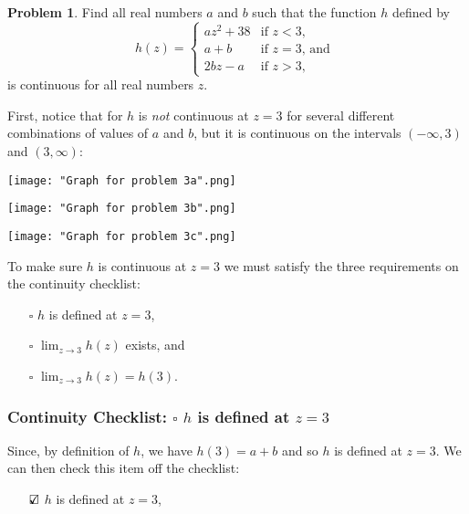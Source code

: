 \documentclass{article}
\theoremstyle{definition}
\newtheorem{Problem}{Problem}
\begin{document}
\begin{Problem}
  Find all real numbers $a$ and $b$ such that the function $h$ defined by
  \[
    h(z) =
    \begin{cases}
      az^2 + 38 &  \mbox{if $z < 3$,}\\
      a + b & \mbox{if $z = 3$, and }\\
      2bz - a &	\mbox{if $z > 3$,}
    \end{cases}
  \]
  is continuous for all real numbers $z$.
\end{Problem}
\begin{Solution}
  First, notice that for $h$ is \emph{not} continuous at $z = 3$ for several different combinations of values of $a$ and $b$, but it is continuous on the intervals $(-\infty, 3)$ and $(3, \infty)$:
  \begin{center}
    \texttt{[image: "Graph for problem 3a".png]}
  \end{center}
  \begin{center}
    \texttt{[image: "Graph for problem 3b".png]}
  \end{center}
  \begin{center}
    \texttt{[image: "Graph for problem 3c".png]}
  \end{center}

  To make sure $h$ is continuous at $z = 3$ we must satisfy the three requirements on the continuity checklist:
  \begin{itemize}
    \item[$\square$]
      $h$ is defined at $z = 3$,

    \item[$\square$]
      $\lim_{z \to 3} h(z)$ exists, and

    \item[$\square$]  
      $\lim_{z \to 3} h(z) = h(3)$.
  \end{itemize}
  
  \subsubsection*{Continuity Checklist: $\square$ $h$ is defined at $z = 3$}
  Since, by definition of $h$, we have $h(3) = a + b$ and so $h$ is defined at $z = 3$.
  We can then check this item off the checklist:
  \begin{itemize}
    \item[$\text{\rlap{$\checkmark$}}\square$]
      $h$ is defined at $z = 3$,


\end{itemize}
\end{Solution}
\end{document}
